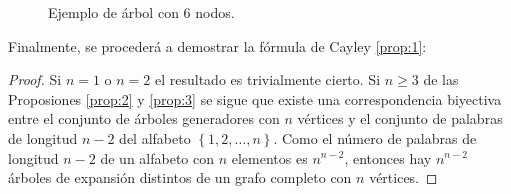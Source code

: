 \begin{figure}[H]
\centering
{}
\caption{Ejemplo de árbol con $6$ nodos.}
\label{fig:arbol2}
\end{figure}

Finalmente, se procederá a demostrar la fórmula de Cayley \ref{prop:1}:
\begin{proof}
Si $n = 1$ o $n = 2$ el resultado es trivialmente cierto. Si $n \geq 3$ de las Proposiones \ref{prop:2} y \ref{prop:3} se sigue que existe una correspondencia biyectiva entre el conjunto de árboles generadores con $n$ vértices y el conjunto de palabras de longitud $n-2$ del alfabeto $\left\lbrace 1,2,\dots,n \right\rbrace$. Como el número de palabras de longitud $n-2$ de un alfabeto con $n$ elementos es $n^{n-2}$, entonces hay $n^{n-2}$ árboles de expansión distintos de un grafo completo con $n$ vértices.
\end{proof}